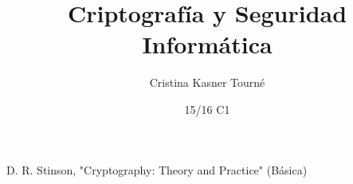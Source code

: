 \documentclass[nochap]{apuntes}
\title{Criptografía y Seguridad Informática}
\author{Cristina Kasner Tourné}
\date{15/16 C1}
\begin{document}
\pagestyle{plain}
\maketitle

\tableofcontents
\newpage





\appendix




\newpage
\begin{thebibliography}{}
	D. R. Stinson, "Cryptography: Theory and Practice" (Básica)

	
\end{thebibliography}

\printindex
\end{document}
